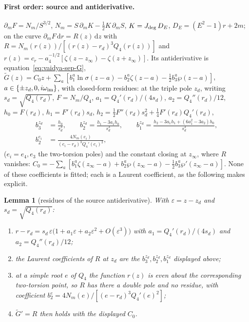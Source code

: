 \documentclass[12pt]{iopart}
\newcommand{\Jc}{J_{\rm deg}}
\newcommand{\dd}{\mathrm{d}}
\theoremstyle{plain}
\theoremstyle{definition}
\theoremstyle{plain}
\newtheorem{auxlemma}{Lemma}
\theoremstyle{remark}
\begin{document}
\paragraph{First order: source and antiderivative.}
$\partial_m F=N_m/S^{3/2}$, $N_m=S\,\partial_mK-\tfrac12K\,\partial_mS$, $K=\Jc\,D_E$,
$D_E=(E^2-1)r+2m$; on the curve $\partial_m F\,\dd r=R(z)\,\dd z$ with
$R=N_m(r(z))/[(r(z)-r_d)^3Q_4(r(z))]$ and $r(z)=c_r-a_4^{-1/2}[\zeta(z-z_\infty)-
\zeta(z+z_\infty)]$. Its antiderivative is equation~\eqref{eq:vaidya-sep-G},
$\tilde G(z)=C_0 z+\sum_{a}[b_1^a\ln\sigma(z-a)-b_2^a\zeta(z-a)-\tfrac12 b_3^a
\wp(z-a)]$, $a\in\{\pm z_d,0,i\omega_{\rm im}\}$, with closed-form residues: at the
triple pole $z_d$, writing $s_d=\sqrt{Q_4(r_d)}$, $F=N_m/Q_4$, $a_1=Q_4'(r_d)/(4s_d)$,
$a_2=Q_4''(r_d)/12$, $h_0=F(r_d)$, $h_1=F'(r_d)s_d$,
$h_2=\tfrac12F''(r_d)s_d^2+\tfrac14F'(r_d)Q_4'(r_d)$,
\begin{equation}
\begin{aligned}
b_3^{z_d}&=\frac{h_0}{s_d^3},\qquad
b_2^{z_d}=\frac{h_1-3a_1h_0}{s_d^3},\qquad
b_1^{z_d}=\frac{h_2-3a_1h_1+(6a_1^2-3a_2)h_0}{s_d^3},\\
b_2^{e_i}&=\frac{4N_m(e_i)}{(e_i-r_d)^3Q_4'(e_i)^2},
\end{aligned}
\end{equation}
($e_i=e_4,e_3$ the two-torsion poles) and the constant closing at $z_\infty$, where
$R$ vanishes: $C_0=-\sum_a[b_1^a\zeta(z_\infty-a)+b_2^a\wp(z_\infty-a)-\tfrac12
b_3^a\wp'(z_\infty-a)]$. None of these coefficients is fitted; each is a Laurent
coefficient, as the following makes explicit.

\begin{auxlemma}[residues of the source antiderivative]\label{lem:residues}
With $\varepsilon=z-z_d$ and $s_d=\sqrt{Q_4(r_d)}$:
\begin{enumerate}
\item[(i)] $r-r_d=s_d\,\varepsilon\big(1+a_1\varepsilon+a_2\varepsilon^2+O(\varepsilon^3)\big)$
with $a_1=Q_4'(r_d)/(4s_d)$ and $a_2=Q_4''(r_d)/12$;
\item[(ii)] the Laurent coefficients of $R$ at $z_d$ are the $b_3^{z_d},b_2^{z_d},b_1^{z_d}$
displayed above;
\item[(iii)] at a simple root $e$ of $Q_4$ the function $r(z)$ is \emph{even} about the
corresponding two-torsion point, so $R$ has there a double pole and \emph{no} residue,
with coefficient $b_2^{e}=4N_m(e)/[(e-r_d)^3Q_4'(e)^2]$;
\item[(iv)] $\tilde G'=R$ then holds with the displayed $C_0$.
\end{enumerate}
\end{auxlemma}
\end{document}
